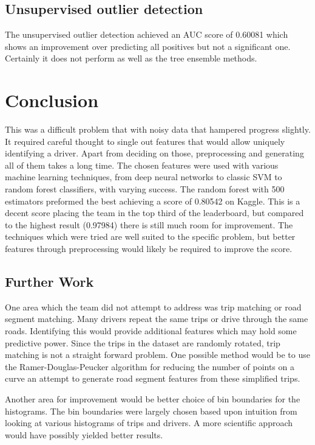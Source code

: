 \documentclass[a4paper, 11pt, twocolumn]{report}
\begin{document}
\subsection{Unsupervised outlier detection}
The unsupervised outlier detection achieved an AUC score of 0.60081 which shows an improvement over predicting all positives but not a significant one. 
Certainly it does not perform as well as the tree ensemble methods.

\section{Conclusion}
This was a difficult problem that with noisy data that hampered progress slightly.
It required careful thought to single out features that would allow uniquely identifying a driver.
Apart from deciding on those, preprocessing and generating all of them takes a long time.
The chosen features were used with various machine learning techniques, from deep neural networks to classic SVM to random forest classifiers, with varying success.
The random forest with 500 estimators preformed the best achieving a score of 0.80542 on Kaggle.
This is a decent score placing the team in the top third of the leaderboard, but compared to the highest result (0.97984) there is still much room for improvement.
The techniques which were tried are well suited to the specific problem, but better features through preprocessing would likely be required to improve the score. 


\subsection{Further Work}
One area which the team did not attempt to address was trip matching or road segment matching. Many drivers repeat the same trips or drive through the same roads. Identifying this would provide additional features which may hold some predictive power. Since the trips in the dataset are randomly rotated, trip matching is not a straight forward problem. One possible method would be to use the Ramer-Douglas-Peucker algorithm\cite{ramer1972iterative} for reducing the number of points on a curve an attempt to generate road segment features from these simplified trips.

Another area for improvement would be better choice of bin boundaries for the histograms. The bin boundaries were largely chosen based upon intuition from looking at various histograms of trips and drivers. A more scientific approach would have possibly yielded better results.


\printbibliography
\end{document}
